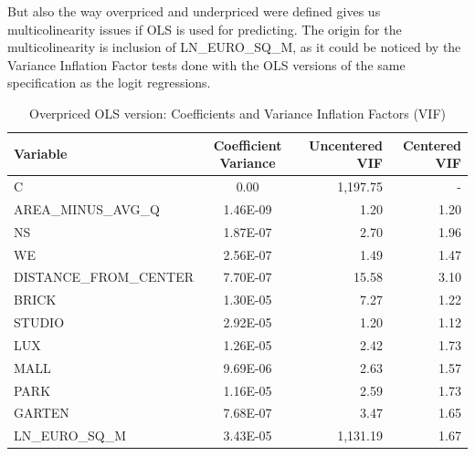 \documentclass[]{article}
\begin{document}
But also the way overpriced and underpriced were defined gives us multicolinearity issues if OLS is used for predicting. The origin for the multicolinearity is inclusion of LN\_EURO\_SQ\_M, as it could be noticed by the Variance Inflation Factor tests done with the OLS versions of the same specification as the logit regressions.

\begin{table}[h!]
	\centering
	\caption{Overpriced OLS version: Coefficients and Variance Inflation Factors (VIF)}
	\begin{tabular}{lcrr}
		\hline
		Variable               & Coefficient Variance & Uncentered VIF & Centered VIF \\
		\hline
		C                      & 0.00                 & 1,197.75       & -            \\
		AREA\_MINUS\_AVG\_Q   & 1.46E-09             & 1.20           & 1.20         \\
		NS                     & 1.87E-07             & 2.70           & 1.96         \\
		WE                     & 2.56E-07             & 1.49           & 1.47         \\
		DISTANCE\_FROM\_CENTER & 7.70E-07             & 15.58          & 3.10         \\
		BRICK                  & 1.30E-05             & 7.27           & 1.22         \\
		STUDIO                 & 2.92E-05             & 1.20           & 1.12         \\
		LUX                    & 1.26E-05             & 2.42           & 1.73         \\
		MALL                   & 9.69E-06             & 2.63           & 1.57         \\
		PARK                   & 1.16E-05             & 2.59           & 1.73         \\
		GARTEN                 & 7.68E-07             & 3.47           & 1.65         \\
		LN\_EURO\_SQ\_M        & 3.43E-05             & 1,131.19       & 1.67         \\
		\hline
	\end{tabular}
\end{table}
\end{document}
